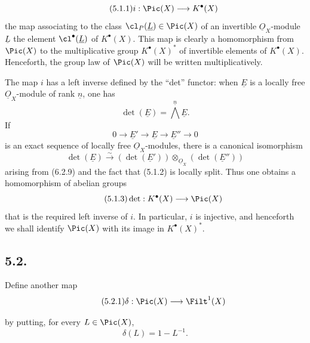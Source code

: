 \begin{equation}\tag{5.1.1}
 i:\Pic(X)\longrightarrow K^{\bullet}(X)
\end{equation}
the map associating to the class \(\cl_P(\underline{L})\in\Pic(X)\) of an invertible \(\underline{O}_X\)-module \(\underline{L}\) the element \(\cl^{\bullet}(\underline{L})\) of \(K^{\bullet}(X)\). This map is clearly a homomorphism from \(\Pic(X)\) to the multiplicative group \(K^{\bullet}(X)^*\) of invertible elements of \(K^{\bullet}(X)\). Henceforth, the group law of \(\Pic(X)\) will be written multiplicatively.

The map \(i\) has a left inverse defined by the ``det'' functor: when \(\underline{E}\) is a locally free \(\underline{O}_X\)-module of rank \(\underline{n}\), one has
\[
 \det(\underline{E})=\bigwedge^{\underline{n}} \underline{E}.
\]
If
\begin{equation}\tag{5.1.2}
0\longrightarrow \underline{E}'\longrightarrow \underline{E}\longrightarrow \underline{E}''\longrightarrow0
\end{equation}
is an exact sequence of locally free \(\underline{O}_X\)-modules, there is a canonical isomorphism
\[
 \det(\underline{E})\xrightarrow{\sim}(\det(\underline{E}'))\otimes_{\underline{O}_X}(\det(\underline{E}''))
\]
arising from (6.2.9) and the fact that (5.1.2) is locally split. Thus one obtains a homomorphism of abelian groups
\begin{equation}\tag{5.1.3}
 \det:K^{\bullet}(X)\longrightarrow\Pic(X)
\end{equation}
that is the required left inverse of \(i\). In particular, \(i\) is injective, and henceforth we shall identify \(\Pic(X)\) with its image in \(K^{\bullet}(X)^*\).

\subsection*{5.2.}
Define another map
\begin{equation}\tag{5.2.1}
 \delta:\Pic(X)\longrightarrow\Filt^1(X)
\end{equation}


%

by putting, for every \(L\in\Pic(X)\),
\[
 \delta(L)=1-L^{-1}.
\]

